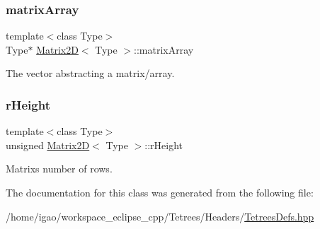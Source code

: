 \subsubsection{\texorpdfstring{matrix\+Array}{matrixArray}}
{\footnotesize\ttfamily template$<$class Type$>$ \\
Type$\ast$ \hyperlink{classMatrix2D}{Matrix2D}$<$ Type $>$\+::matrix\+Array\hspace{0.3cm}{\ttfamily [private]}}

The vector abstracting a matrix/array. \mbox{\label{classMatrix2D_afdcd47964719a1c4e006fbdd313d2f17}} 
\subsubsection{\texorpdfstring{r\+Height}{rHeight}}
{\footnotesize\ttfamily template$<$class Type$>$ \\
unsigned \hyperlink{classMatrix2D}{Matrix2D}$<$ Type $>$\+::r\+Height\hspace{0.3cm}{\ttfamily [private]}}

Matrix\textquotesingle{}s number of rows. 

The documentation for this class was generated from the following file\+:\begin{DoxyCompactItemize}
\item 
/home/igao/workspace\+\_\+eclipse\+\_\+cpp/\+Tetrees/\+Headers/\hyperlink{TetreesDefs_8hpp}{Tetrees\+Defs.\+hpp}\end{DoxyCompactItemize}
